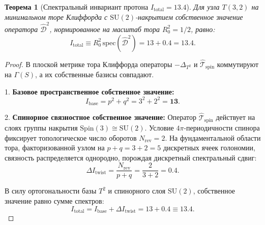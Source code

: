 \documentclass[12pt,a4paper]{article}
\newtheorem{theorem}{Теорема}
\begin{document}
	\begin{theorem}[Спектральный инвариант протона $I_{\mathrm{total}} = 13.4$]
		Для узла $T(3,2)$ на минимальном торе Клиффорда с $\mathrm{SU}(2)$-накрытием собственное значение оператора $\hat{\mathcal{D}}^2$, нормированное на масштаб тора $R_0^2 = 1/2$, равно:
		\begin{equation}
			I_{\mathrm{total}} \equiv R_0^2 \, \mathrm{spec}(\hat{\mathcal{D}}^2) = 13 + 0.4 = \mathbf{13.4}.
		\end{equation}
	\end{theorem}
	
	\begin{proof}
		В плоской метрике тора Клиффорда операторы $-\Delta_{T^2}$ и $\hat{\mathcal{T}}_{\text{spin}}$ коммутируют на $\Gamma(S)$, а их собственные базисы совпадают.
		
		1. \textbf{Базовое пространственное собственное значение:}
		\begin{equation}
			I_{\text{base}} = p^2 + q^2 = 3^2 + 2^2 = \mathbf{13}.
		\end{equation}
		
		2. \textbf{Спинорное связностное собственное значение:}
		Оператор $\hat{\mathcal{T}}_{\text{spin}}$ действует на слоях группы накрытия $\mathrm{Spin}(3) \cong \mathrm{SU}(2)$. Условие $4\pi$-периодичности спинора фиксирует топологическое число оборотов $N_{\text{rev}} = 2$. На фундаментальной области тора, факторизованной узлом на $p+q = 3+2 = 5$ дискретных ячеек голономии, связность распределяется однородно, порождая дискретный спектральный сдвиг:
		\begin{equation}
			\Delta I_{\text{twist}} = \frac{N_{\text{rev}}}{p + q} = \frac{2}{3 + 2} = \mathbf{0.4}.
		\end{equation}
		
		В силу ортогональности базы $T^2$ и спинорного слоя $\mathrm{SU}(2)$, собственное значение равно сумме спектров:
		\begin{equation}
			I_{\text{total}} = I_{\text{base}} + \Delta I_{\text{twist}} = 13 + 0.4 \equiv \mathbf{13.4}.
		\end{equation}
	\end{proof}
	
\end{document}
